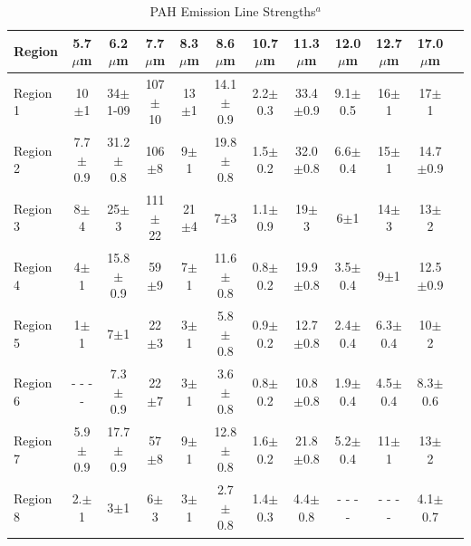 \begin{table}
 \centering
 \begin{minipage}{200mm}
\caption{PAH Emission Line Strengths$^a$}
  \begin{tabular}{l c c  c  c  c  c  c  c  c  c c }
  \hline {Region  }&{5.7$\mu$m  }&{6.2$\mu$m  }&{7.7$\mu$m  }&{8.3$\mu$m  }&{8.6$\mu$m  }&{10.7$\mu$m  }&{11.3$\mu$m  }&{12.0$\mu$m  }&{12.7$\mu$m  }&{17.0$\mu$m  } 
   \\
 \hline
 Region 1 &10$\pm$1            & 34$\pm$1-09        & 107$\pm$10        & 13$\pm$1       & 14.1$\pm$0.9        & 2.2$\pm$0.3        & 33.4$\pm$0.9        & 9.1$\pm$0.5        & 16$\pm$1        & 17$\pm$1        \\
Region 2 &7.7$\pm$0.9        & 31.2$\pm$0.8        & 106$\pm$8        & 9$\pm$1           & 19.8$\pm$0.8        & 1.5$\pm$0.2        & 32.0$\pm$0.8        & 6.6$\pm$0.4        & 15$\pm$1        & 14.7$\pm$0.9        \\
Region 3 &8$\pm$4              & 25$\pm$3                & 111$\pm$22       & 21$\pm$4       & 7$\pm$3                 & 1.1$\pm$0.9        & 19$\pm$3             & 6$\pm$1             & 14$\pm$3           & 13$\pm$2        \\
Region 4 &4$\pm$1              & 15.8$\pm$0.9        & 59$\pm$9        & 7$\pm$1           & 11.6$\pm$0.8          & 0.8$\pm$0.2        & 19.9$\pm$0.8        & 3.5$\pm$0.4        & 9$\pm$1             & 12.5$\pm$0.9        \\
Region 5 &1$\pm$1              & 7$\pm$1                 & 22$\pm$3        & 3$\pm$1           & 5.8$\pm$0.8            & 0.9$\pm$0.2        & 12.7$\pm$0.8        & 2.4$\pm$0.4        & 6.3$\pm$0.4        & 10$\pm$2        \\
Region 6 & - - - -                      & 7.3$\pm$0.9         & 22$\pm$7        & 3$\pm$1            & 3.6$\pm$0.8            & 0.8$\pm$0.2        & 10.8$\pm$0.8        & 1.9$\pm$0.4        & 4.5$\pm$0.4        & 8.3$\pm$0.6        \\
Region 7 &5.9$\pm$0.9        & 17.7$\pm$0.9       & 57$\pm$8        & 9$\pm$1            & 12.8$\pm$0.8        & 1.6$\pm$0.2        & 21.8$\pm$0.8        & 5.2$\pm$0.4        & 11$\pm$1             & 13$\pm$2        \\
Region 8 &2.$\pm$1              & 3$\pm$1              & 6$\pm$3            & 3$\pm$1            & 2.7$\pm$0.8        & 1.4$\pm$0.3        & 4.4$\pm$0.8            & - - - -                      &  - - - -                       & 4.1$\pm$0.7        \\

\end{tabular}
\end{minipage}
\end{table}
